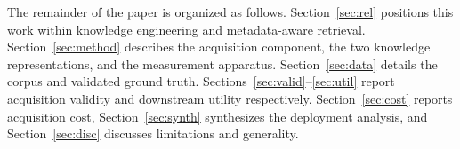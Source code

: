 The remainder of the paper is organized as follows. Section~\ref{sec:rel}
positions this work within knowledge engineering and metadata-aware
retrieval. Section~\ref{sec:method} describes the acquisition component, the
two knowledge representations, and the measurement apparatus.
Section~\ref{sec:data} details the corpus and validated ground truth.
Sections~\ref{sec:valid}--\ref{sec:util} report acquisition validity and
downstream utility respectively. Section~\ref{sec:cost} reports acquisition
cost, Section~\ref{sec:synth} synthesizes the deployment analysis, and
Section~\ref{sec:disc} discusses limitations and generality.
